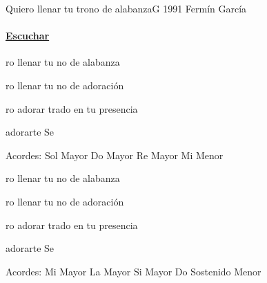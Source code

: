 \documentclass[12pt, spanish]{book}
\begin{document}
    \begin{song}{Quiero llenar tu trono de alabanza}{G}
    {1991} %
    {Fermín García}
    {} %
    {}
        \ifChordBk
            \paragraph{\mbox{}\hfill\protect\href{https://open.spotify.com/intl-es/track/2SynO1bOeC3VluTUvF4rt9}{Escuchar}\mbox{}\hfill}
        \fi

        \begin{SBOpGroup}
            ro llenar tu no de alabanza

            ro llenar tu no de adoración

            ro adorar trado en tu presencia

             adorarte Se
        \end{SBOpGroup}

        \ifChordBk
        \begin{SBOpGroup}
            Acordes:\break
            \upchord{\G}\qquad Sol Mayor \hfill
            \upchord{\C}\qquad Do Mayor \hfill\null\break
            \upchord{\D}\qquad Re Mayor  \hfill
            \upchord{\Em}\qquad Mi Menor \hfill\null\break
        \end{SBOpGroup}
        \fi
        \begin{SBExtraKeys}{

            \begin{SBOpGroup}
                ro llenar tu no de alabanza

                ro llenar tu no de adoración

                ro adorar trado en tu presencia

                 adorarte Se
            \end{SBOpGroup}

            \ifChordBk
            \begin{SBOpGroup}
                Acordes:\break
                \upchord{\E}\qquad Mi Mayor \hfill
                \upchord{\A}\qquad La Mayor \hfill\null\break
                \upchord{\B}\qquad\qquad Si Mayor \hfill
                \upchord{\Csm}Do Sostenido Menor \hfill\null\break
            \end{SBOpGroup}
            \fi
        }\end{SBExtraKeys}
    \end{song}
\end{document}

